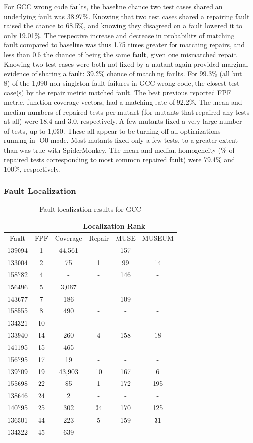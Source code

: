For GCC wrong code faults, the baseline chance two test cases shared an underlying fault was 38.97\%.  Knowing that two test cases shared a repairing fault raised the chance to 68.5\%, and knowing they disagreed on a fault lowered it to only 19.01\%.  The respective increase and decrease in probability of matching fault compared to baseline was thus 1.75 times greater for matching repairs, and less than 0.5 the chance of being the same fault, given one mismatched repair.  Knowing two test cases were both not fixed by a mutant again provided marginal evidence of sharing a fault: 39.2\% chance of matching faults.
For 99.3\% (all but 8) of the 1,090 non-singleton fault failures in GCC wrong code, the closest test case(s) by the repair metric matched fault.  The best previous reported FPF metric, function coverage vectors, had a matching rate of 92.2\%.   The mean and median numbers of repaired tests per mutant (for mutants that repaired any tests at all) were 18.4 and 3.0, respectively.  A few mutants fixed a very large number of tests, up to 1,050.  These all appear to be turning off all optimizations --- running in -O0 mode.  Most mutants fixed only a few tests, to a greater extent than was true with SpiderMonkey.    The mean and median homogeneity (\% of repaired tests corresponding to most common repaired fault) were 79.4\% and 100\%, respectively.

\subsubsection{Fault Localization}

\begin{table}
\centering
{\scriptsize
\begin{tabular}{|c||c||c|c|c|c|}
\hline
& & \multicolumn{4}{|c|}{Localization Rank} \\
\hline
Fault & FPF & Coverage & Repair & MUSE & MUSEUM \\
\hline
139094 & 1 & 44,561 & - & 157 & -\\
133004 & 2 & 75 & 1 & 99 & 14\\
158782 & 4 & - & - & 146 & -\\
156496 & 5 & 3,067 & - & - & -\\
143677 & 7 & 186 & - & 109 & -\\
158555 & 8 & 490 & - & - & -\\
134321 & 10 & - & - & - & -\\
133940 & 14 & 260 & 4 & 158 & 18\\
141195 & 15 & 465 & - & - & -\\
156795 & 17 & 19 & - & - & -\\
139709 & 19 & 43,903 & 10 & 167 & 6\\
155698 & 22 & 85 & 1 & 172 & 195\\
138646 & 24 & 2 & - & - & -\\
140795 & 25 & 302 & 34 & 170 & 125\\
136501 & 44 & 223 & 5 & 159 & 31\\
134322 & 45 & 639 & - & - & -\\
\hline
\end{tabular}
}
\caption{Fault localization results for GCC}
\label{gcctable}
\end{table}

